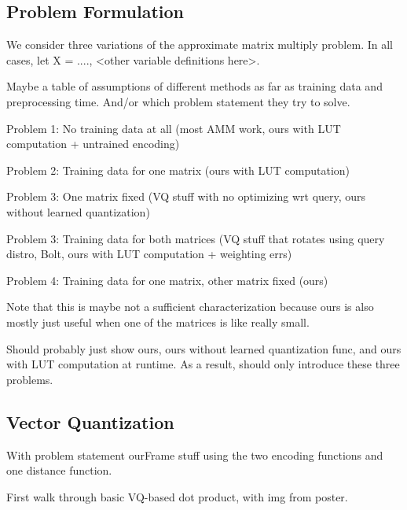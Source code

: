 
\subsection{Problem Formulation}

We consider three variations of the approximate matrix multiply problem. In all cases, let X = ...., <other variable definitions here>.

Maybe a table of assumptions of different methods as far as training data and preprocessing time. And/or which problem statement they try to solve.

Problem 1: No training data at all (most AMM work, ours with LUT computation + untrained encoding)

Problem 2: Training data for one matrix (ours with LUT computation)

Problem 3: One matrix fixed (VQ stuff with no optimizing wrt query, ours without learned quantization)

Problem 3: Training data for both matrices (VQ stuff that rotates using query distro, Bolt, ours with LUT computation + weighting errs)

Problem 4: Training data for one matrix, other matrix fixed (ours)


Note that this is maybe not a sufficient characterization because ours is also mostly just useful when one of the matrices is like really small.

Should probably just show ours, ours without learned quantization func, and ours with LUT computation at runtime. As a result, should only introduce these three problems.

\subsection{Vector Quantization}

With problem statement ourFrame stuff using the two encoding functions and one distance function.

First walk through basic VQ-based dot product, with img from poster.
